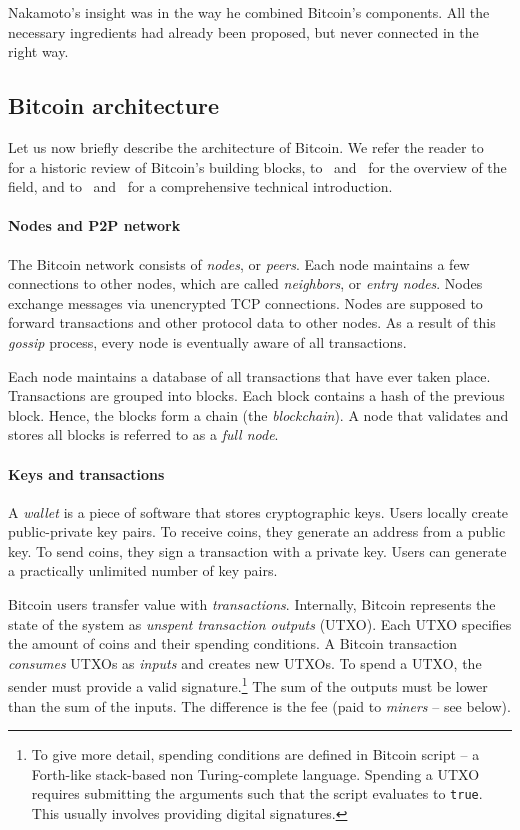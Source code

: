 Nakamoto's insight was in the way he combined Bitcoin's components.
All the necessary ingredients had already been proposed, but never connected in the right way.


\subsection{Bitcoin architecture}

Let us now briefly describe the architecture of Bitcoin.
We refer the reader to~\cite{Narayanan2017} for a historic review of Bitcoin's building blocks, to~\cite{Bonneau2015} and~\cite{Tschorsch2016} for the overview of the field, and to~\cite{Narayanan2016} and~\cite{Antonopoulos2014} for a comprehensive technical introduction.

\paragraph{Nodes and P2P network}

The Bitcoin network consists of \textit{nodes}, or \textit{peers}.
Each node maintains a few connections to other nodes, which are called \textit{neighbors}, or \textit{entry nodes}.
Nodes exchange messages via unencrypted TCP connections.
Nodes are supposed to forward transactions and other protocol data to other nodes.
As a result of this \textit{gossip} process, every node is eventually aware of all transactions.

Each node maintains a database of all transactions that have ever taken place.
Transactions are grouped into blocks.
Each block contains a hash of the previous block.
Hence, the blocks form a chain (the \textit{blockchain}).
A node that validates and stores all blocks is referred to as a \textit{full node}.

\paragraph{Keys and transactions}

A \textit{wallet} is a piece of software that stores cryptographic keys.
Users locally create public-private key pairs.
To receive coins, they generate an address from a public key.
To send coins, they sign a transaction with a private key.
Users can generate a practically unlimited number of key pairs.

Bitcoin users transfer value with \textit{transactions}.
Internally, Bitcoin represents the state of the system as \textit{unspent transaction outputs} (UTXO).
Each UTXO specifies the amount of coins and their spending conditions.
A Bitcoin transaction \textit{consumes} UTXOs as \textit{inputs} and creates new UTXOs.
To spend a UTXO, the sender must provide a valid signature.\footnote{To give more detail, spending conditions are defined in Bitcoin script -- a Forth-like stack-based non Turing-complete language.
Spending a UTXO requires submitting the arguments such that the script evaluates to \texttt{true}.
This usually involves providing digital signatures.}
The sum of the outputs must be lower than the sum of the inputs.
The difference is the fee (paid to \textit{miners} -- see below).


